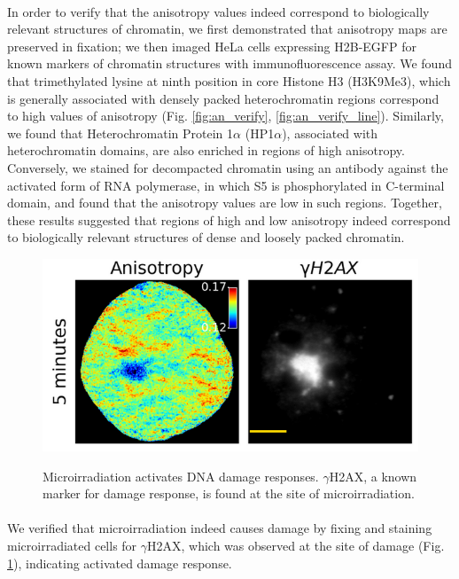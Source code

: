 \paragraph*{} In order to verify that the anisotropy values indeed correspond to biologically relevant structures of chromatin, we first demonstrated that anisotropy maps are preserved in fixation; we then imaged HeLa cells expressing H2B-EGFP for known markers of chromatin structures with immunofluorescence assay. We found that trimethylated lysine at ninth position in core Histone H3 (H3K9Me3), which is generally associated with densely packed heterochromatin regions correspond to high values of anisotropy (Fig. \ref{fig:an_verify}, \ref{fig:an_verify_line}). Similarly, we found that Heterochromatin Protein 1$\alpha$ (HP1$\alpha$), associated with heterochromatin domains, are also enriched in regions of high anisotropy. Conversely, we stained for decompacted chromatin using an antibody against the activated form of RNA polymerase, in which S5 is phosphorylated in C-terminal domain, and found that the anisotropy values are low in such regions. Together, these results suggested that regions of high and low anisotropy indeed correspond to biologically relevant structures of dense and loosely packed chromatin.  

\begin{figure}[H]
    {\hfill\includegraphics[clip,width=0.8\linewidth]{figures/micro_gh2ax.png}\hspace*{\fill}}
    \caption{Microirradiation activates DNA damage responses. $\gamma$H2AX, a known marker for damage response, is found at the site of microirradiation.}
    {\label{fig:micro_gh2ax}}
\end{figure}
\paragraph*{} We verified that microirradiation indeed causes damage by fixing and staining microirradiated cells for $\gamma$H2AX, which was observed at the site of damage (Fig. {\ref{fig:micro_gh2ax}}), indicating activated damage response.




